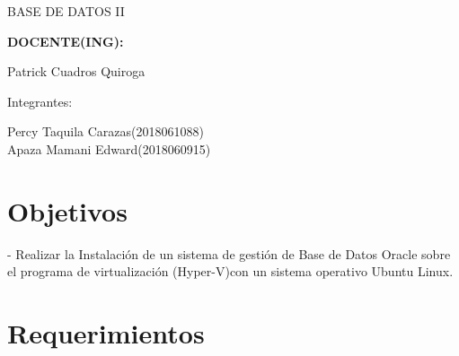 \documentclass[12pt,letterpaper]{article}
\begin{document}
\begin{titlepage}
\begin{center}
\vspace*{0.1in}
\begin{large}
BASE DE DATOS II\\
\end{large}

\vspace*{0.3in}
\begin{Large}
\textbf{DOCENTE(ING):} \\
\end{Large}

\vspace*{0.1in}
\begin{large}
 Patrick Cuadros Quiroga\\
\end{large}

\vspace*{0.2in}
\vspace*{0.1in}
\begin{large}
Integrantes: \\
\begin{flushleft}
Percy Taquila Carazas\hfill	(2018061088) \\
Apaza Mamani Edward\hfill	(2018060915) \\
\end{flushleft}
\end{large}
\end{center}

\end{titlepage}

\tableofcontents %
\thispagestyle{empty} %
\newpage
\setcounter{page}{1} %


\section{Objetivos} 

\begin{itemize}
- Realizar la Instalación de un sistema de gestión de Base de Datos Oracle sobre el programa de virtualización (Hyper-V)con un sistema operativo Ubuntu Linux.\\
\end{itemize} 


\section{Requerimientos} 
\end{document}
